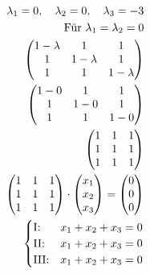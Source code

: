 \begin{align*}
    \lambda_1 = 0, \quad \lambda_2 = 0, \quad \lambda_3 = -3 \\
    \text{Für } \lambda_1 = \lambda_2 = 0 \\
    \begin{pmatrix}
        1 - \lambda & 1 & 1 \\
        1 & 1 - \lambda & 1 \\
        1 & 1 & 1 - \lambda    
    \end{pmatrix} \\
    \begin{pmatrix}
        1 - 0 & 1 & 1 \\
        1 & 1 - 0 & 1 \\
        1 & 1 & 1 - 0    
    \end{pmatrix} \\
    \begin{pmatrix}
        1 & 1 & 1 \\
        1 & 1 & 1 \\
        1 & 1 & 1    
    \end{pmatrix} \\
    \begin{pmatrix}
        1 & 1 & 1 \\
        1 & 1 & 1 \\
        1 & 1 & 1    
    \end{pmatrix} \cdot \begin{pmatrix}
        x_1 \\ x_2 \\ x_3
    \end{pmatrix} = \begin{pmatrix}
        0 \\ 0 \\ 0
    \end{pmatrix} \\
    \begin{cases}
        \text{I:\@} & x_1 + x_2 + x_3 = 0 \\
        \text{II:\@} & x_1 + x_2 + x_3 = 0 \\
        \text{III:\@} & x_1 + x_2 + x_3 = 0 \\
    \end{cases}
\end{align*}

